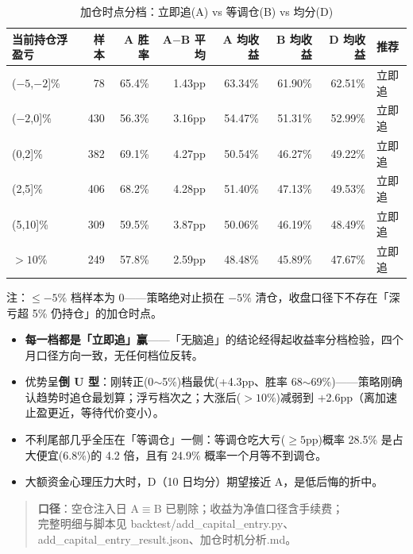 \documentclass[11pt]{ctexart}
\newcommand{\pos}[1]{\textcolor{poscol}{#1}}   %
\begin{document}
\begin{table}[htbp]
\centering
\caption{加仓时点分档：立即追(A) vs 等调仓(B) vs 均分(D)}
\small
\begin{tabular}{lrrrrrrl}
\toprule
当前持仓浮盈亏 & 样本 & A 胜率 & A$-$B 平均 & A 均收益 & B 均收益 & D 均收益 & 推荐 \\
\midrule
($-5$,$-2$]\% & 78 & 65.4\% & \pos{1.43pp} & 63.34\% & 61.90\% & 62.51\% & 立即追 \\
($-2$,0]\% & 430 & 56.3\% & \pos{3.16pp} & 54.47\% & 51.31\% & 52.99\% & 立即追 \\
(0,2]\% & 382 & 69.1\% & \pos{4.27pp} & 50.54\% & 46.27\% & 49.22\% & 立即追 \\
(2,5]\% & 406 & 68.2\% & \pos{4.28pp} & 51.40\% & 47.13\% & 49.53\% & 立即追 \\
(5,10]\% & 309 & 59.5\% & \pos{3.87pp} & 50.06\% & 46.19\% & 48.49\% & 立即追 \\
$>10\%$ & 249 & 57.8\% & \pos{2.59pp} & 48.48\% & 45.89\% & 47.67\% & 立即追 \\
\bottomrule
\end{tabular}

\small 注：$\le-5\%$ 档样本为 0——策略绝对止损在 $-5\%$ 清仓，收盘口径下不存在「深亏超 5\% 仍持仓」的加仓时点。
\end{table}

\begin{itemize}
  \item \textbf{每一档都是「立即追」赢}——「无脑追」的结论经得起收益率分档检验，四个月口径方向一致，无任何档位反转。
  \item 优势呈\textbf{倒 U 型}：刚转正(0$\sim$5\%)档最优(+4.3pp、胜率 68$\sim$69\%)——策略刚确认趋势时追仓最划算；浮亏档次之；大涨后($>10\%$)减弱到 +2.6pp（离加速止盈更近，等待代价变小）。
  \item 不利尾部几乎全压在「等调仓」一侧：等调仓吃大亏($\ge5$pp)概率 28.5\% 是占大便宜(6.8\%)的 4.2 倍，且有 24.9\% 概率一个月等不到调仓。
  \item 大额资金心理压力大时，D（10 日均分）期望接近 A，是低后悔的折中。
\end{itemize}

\begin{quote}\footnotesize
\textbf{口径}：空仓注入日 A$\equiv$B 已剔除；收益为净值口径含手续费；\\
完整明细与脚本见 backtest/add\_capital\_entry.py、add\_capital\_entry\_result.json、加仓时机分析.md。
\end{quote}

\end{document}
